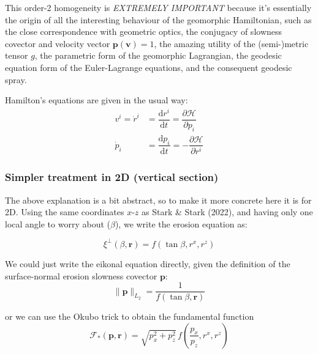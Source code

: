 \documentclass[11pt]{article}
\begin{document}
This order-2 homogeneity is \emph{EXTREMELY IMPORTANT} because it's
essentially the origin of all the interesting behaviour of the
geomorphic Hamiltonian, such as the close correspondence with geometric
optics, the conjugacy of slowness covector and velocity vector
\(\mathbf{p}(\mathbf{v})=1\), the amazing utility of the (semi-)metric
tensor \(g\), the parametric form of the geomorphic Lagrangian, the
geodesic equation form of the Euler-Lagrange equations, and the
consequent geodesic spray.

Hamilton's equations are given in the usual way: \begin{align}
    v^i = \dot{r}^i 
    &= \dfrac{\mathrm{d}r^i}{\mathrm{d}t} 
    = \dfrac{\partial{\mathcal{H}}}{\partial{p_i}} \\
    \dot{p}_i 
    &= \dfrac{\mathrm{d}p_i}{\mathrm{d}t} 
    = -\dfrac{\partial{\mathcal{H}}}{\partial{r^i}}
\end{align}

    \hypertarget{simpler-treatment-in-2d-vertical-section}{%
\subsubsection*{Simpler treatment in 2D (vertical
section)}\label{simpler-treatment-in-2d-vertical-section}}

    The above explanation is a bit abstract, so to make it more concrete
here it is for 2D. Using the same coordinates \(x\)-\(z\) as Stark \&
Stark (2022), and having only one local angle to worry about
(\(\beta\)), we write the erosion equation as:

\begin{equation}
    \xi^{\perp}\!\left(\beta, \mathbf{r}\right) = f\!\left(\tan\beta, r^x, r^z\right)
\end{equation}

We could just write the eikonal equation directly, given the definition
of the surface-normal erosion slowness covector \(\mathbf{p}\):
\begin{equation}
    \|\mathbf{p}\|_{L_2}= \dfrac{1}{f\!\left(\tan\beta, \mathbf{r}\right)}
\end{equation}

or we can use the Okubo trick to obtain the fundamental function
\begin{equation}
    {\mathcal{F}_*(\mathbf{p},\mathbf{r})}
    = {\sqrt{p_x^2+p_z^2}} \,f\!\left(\dfrac{p_x}{p_z}, r^x, r^z\right)
\end{equation}
\end{document}
